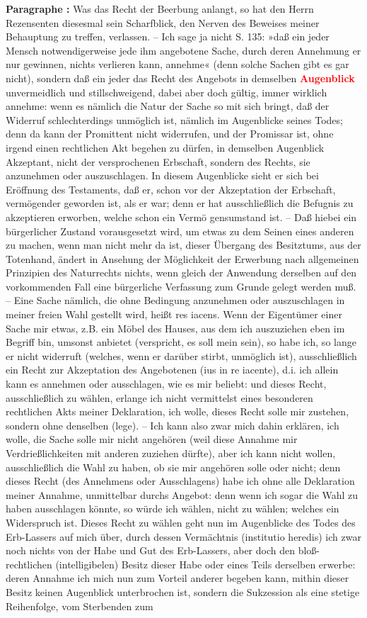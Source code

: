 \documentclass[a4paper,12pt,twoside]{book}
\newcommand{\match}[1]{\textcolor{red}{\textbf{#1}}}
\begin{document}
	\textbf{Paragraphe : }Was das Recht der Beerbung anlangt, so hat den Herrn Rezensenten diesesmal sein Scharfblick, den Nerven des Beweises meiner Behauptung zu treffen, verlassen. – Ich sage ja nicht S. 135: »daß ein jeder Mensch notwendigerweise jede ihm angebotene Sache, durch deren Annehmung er nur gewinnen, nichts verlieren kann, annehme« (denn solche Sachen gibt es gar nicht), sondern daß ein jeder das Recht des Angebots in demselben \match{Augenblick} unvermeidlich und stillschweigend, dabei aber doch gültig, immer wirklich annehme: wenn es nämlich die Natur der Sache so mit sich bringt, daß der Widerruf schlechterdings unmöglich ist, nämlich im Augenblicke seines Todes; denn da kann der Promittent nicht widerrufen, und der Promissar ist, ohne irgend einen rechtlichen Akt begehen zu dürfen, in demselben Augenblick Akzeptant, nicht der versprochenen Erbschaft, sondern des Rechts, sie anzunehmen oder auszuschlagen. In diesem Augenblicke sieht er sich bei Eröffnung des Testaments, daß er, schon vor der Akzeptation der Erbschaft, vermögender geworden ist, als er war; denn er hat ausschließlich die Befugnis zu akzeptieren erworben, welche schon ein Vermö gensumstand ist. – Daß hiebei ein bürgerlicher Zustand vorausgesetzt wird, um etwas zu dem Seinen eines anderen zu machen, wenn man nicht mehr da ist, dieser Übergang des Besitztums, aus der  Totenhand, ändert in Ansehung der Möglichkeit der Erwerbung nach allgemeinen Prinzipien des Naturrechts nichts, wenn gleich der Anwendung derselben auf den vorkommenden Fall eine bürgerliche Verfassung zum Grunde gelegt werden muß. – Eine Sache nämlich, die ohne Bedingung anzunehmen oder auszuschlagen in meiner freien Wahl gestellt wird, heißt res iacens. Wenn der Eigentümer einer Sache mir etwas, z.B. ein Möbel des Hauses, aus dem ich auszuziehen eben im Begriff bin, umsonst anbietet (verspricht, es soll mein sein), so habe ich, so lange er nicht widerruft (welches, wenn er darüber stirbt, unmöglich ist), ausschließlich ein Recht zur Akzeptation des Angebotenen (ius in re iacente), d.i. ich allein kann es annehmen oder ausschlagen, wie es mir beliebt: und dieses Recht, ausschließlich zu wählen, erlange ich nicht vermittelst eines besonderen rechtlichen Akts meiner Deklaration, ich wolle, dieses Recht solle mir zustehen, sondern ohne denselben (lege). – Ich kann also zwar mich dahin erklären, ich wolle, die Sache solle mir nicht angehören (weil diese Annahme mir Verdrießlichkeiten mit anderen zuziehen dürfte), aber ich kann nicht wollen, ausschließlich die Wahl zu haben, ob sie mir angehören solle oder nicht; denn dieses Recht (des Annehmens oder Ausschlagens) habe ich ohne alle Deklaration meiner Annahme, unmittelbar durchs Angebot: denn wenn ich sogar die Wahl zu haben ausschlagen könnte, so würde ich wählen, nicht zu wählen; welches ein Widerspruch ist. Dieses Recht zu wählen geht nun im Augenblicke des Todes des Erb-Lassers auf mich über, durch dessen Vermächtnis (institutio heredis) ich zwar noch nichts von der Habe und Gut des Erb-Lassers, aber doch den bloß-rechtlichen (intelligibelen) Besitz dieser Habe oder eines Teils derselben erwerbe: deren Annahme ich mich nun zum Vorteil anderer begeben kann, mithin dieser Besitz keinen Augenblick unterbrochen ist, sondern die Sukzession als eine stetige Reihenfolge, vom Sterbenden zum 
\end{document}

